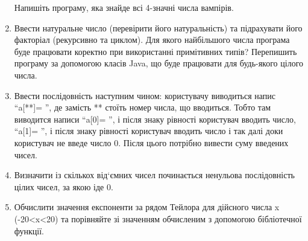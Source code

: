 \documentclass[]{article}
\begin{document}
\begin{enumerate}
Напишіть програму, яка знайде всі 4-значні числа вампірів. 


\item Ввести натуральне число (перевірити його натуральність) та підрахувати його факторіал (рекурсивно та циклом). Для якого найбільшого числа програма буде працювати коректно при використанні примітивних типів? Перепишить програму за допомогою класів Java, що буде працювати для будь-якого цілого числа.

\item Ввести послідовність наступним чином: користувачу виводиться напис “a[**]= ”, де замість ** стоїть номер числа, що вводиться. Тобто там виводится написи “a[0]= ”, і після знаку рівності користувач вводить число,  “a[1]= ”,  і після знаку рівності користувач вводить число і так далі доки користувач не введе число 0. Після цього потрібно вивести суму введених чисел. 

\item Визначити із скількох від`ємних чисел починається ненульова послідовність цілих чисел, за якою іде 0.

\item Обчислити значення експоненти за рядом Тейлора для дійсного числа x (-20<x<20) та порівняйте зі значенням обчисленим з допомогою бібліотечної функції. 


\end{enumerate}
\end{document}
